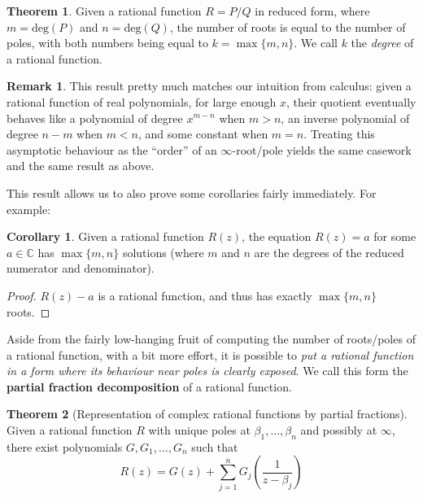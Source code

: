 \documentclass[aps,pra,showpacs,notitlepage,onecolumn,superscriptaddress,nofootinbib]{revtex4-1}
\theoremstyle{definition}
\newtheorem{theorem}{Theorem}[section]
\newtheorem{corollary}{Corollary}[theorem]
\newtheorem{remark}{Remark}[section]
\newcommand{\hhrulefill}{\hspace{-1.5em} \hrulefill}
\begin{document}
\hhrulefill

\begin{theorem}
  Given a rational function $R = P/Q$ in reduced form, where $m = \text{deg}(P)$ and $n = \text{deg}(Q)$, the number of roots is equal to the number of poles, with both numbers being equal to $k = \max\{m, n\}$.
  We call $k$ the \emph{degree} of a rational function.
\end{theorem}

\hhrulefill

\begin{remark}
  This result pretty much matches our intuition from calculus: given a rational function of real polynomials, for large enough $x$, their quotient eventually behaves like a polynomial of degree $x^{m - n}$ when $m > n$,
  an inverse polynomial of degree $n - m$ when $m < n$, and some constant when $m = n$. Treating this asymptotic behaviour as the ``order'' of an $\infty$-root/pole yields the same casework and the same result as above.
\end{remark}

\noindent This result allows us to also prove some corollaries fairly immediately. For example:

\begin{corollary}
  \label{cor:exist}
  Given a rational function $R(z)$, the equation $R(z) = a$ for some $a \in \mathbb{C}$ has $\max\{m, n\}$ solutions (where $m$ and $n$ are the degrees of the reduced numerator and denominator).
\end{corollary}
\begin{proof}
  $R(z) - a$ is a rational function, and thus has exactly $\max\{m, n\}$ roots.
\end{proof}

\noindent Aside from the fairly low-hanging fruit of computing the number of roots/poles of a rational function, with a bit more effort, it is possible to \emph{put a rational function in a form
where its behaviour near poles is clearly exposed}. We call this form the \textbf{partial fraction decomposition} of a rational function.

\begin{theorem}[Representation of complex rational functions by partial fractions]
  Given a rational function $R$ with unique poles at $\beta_1, \dots, \beta_n$ and possibly at $\infty$, there exist polynomials $G, G_1, \dots, G_n$ such that
  \begin{equation}
    R(z) = G(z) + \displaystyle\sum_{j = 1}^{n} G_j \left( \frac{1}{z - \beta_j}\right)
  \end{equation}
\end{theorem}
\end{document}
